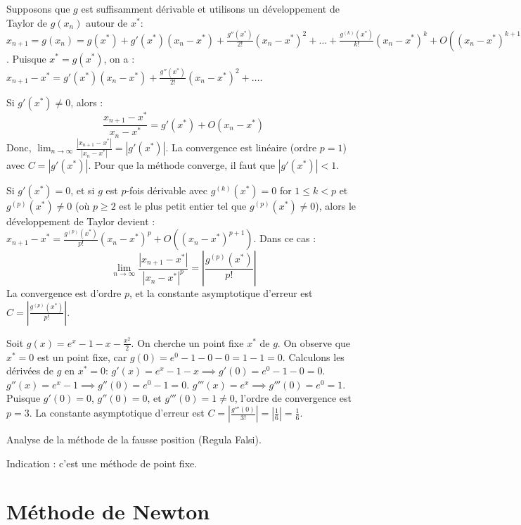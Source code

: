Supposons que $g$ est suffisamment dérivable et utilisons un développement de Taylor de $g(x_n)$ autour de $x^*$:
$x_{n+1} = g(x_n) = g(x^*) + g'(x^*)(x_n - x^*) + \frac{g''(x^*)}{2!}(x_n - x^*)^2 + \dots + \frac{g^{(k)}(x^*)}{k!}(x_n - x^*)^k + O((x_n - x^*)^{k+1})$.
Puisque $x^* = g(x^*)$, on a :
$x_{n+1} - x^* = g'(x^*)(x_n - x^*) + \frac{g''(x^*)}{2!}(x_n - x^*)^2 + \dots$.

Si $g'(x^*) \neq 0$, alors :
$$ \frac{x_{n+1} - x^*}{x_n - x^*} = g'(x^*) + O(x_n - x^*) $$
Donc, $\lim_{n \to \infty} \frac{|x_{n+1} - x^*|}{|x_n - x^*|} = |g'(x^*)|$.
La convergence est linéaire (ordre $p=1$) avec $C = |g'(x^*)|$. Pour que la méthode converge, il faut que $|g'(x^*)| < 1$.

Si $g'(x^*) = 0$, et si $g$ est $p$-fois dérivable avec $g^{(k)}(x^*) = 0$ for $1 \le k < p$ et $g^{(p)}(x^*) \neq 0$ (où $p \ge 2$ est le plus petit entier tel que $g^{(p)}(x^*) \neq 0$), alors le développement de Taylor devient :
$x_{n+1} - x^* = \frac{g^{(p)}(x^*)}{p!}(x_n - x^*)^p + O((x_n - x^*)^{p+1})$.
Dans ce cas :
$$ \lim_{n \to \infty} \frac{|x_{n+1} - x^*|}{|x_n - x^*|^p} = \left|\frac{g^{(p)}(x^*)}{p!}\right| $$
La convergence est d'ordre $p$, et la constante asymptotique d'erreur est $C = \left|\frac{g^{(p)}(x^*)}{p!}\right|$.

\begin{example}
Soit $g(x) = e^x - 1 - x - \frac{x^2}{2}$.
On cherche un point fixe $x^*$ de $g$. On observe que $x^*=0$ est un point fixe, car $g(0) = e^0 - 1 - 0 - 0 = 1 - 1 = 0$.
Calculons les dérivées de $g$ en $x^*=0$:
$g'(x) = e^x - 1 - x \implies g'(0) = e^0 - 1 - 0 = 0$.
$g''(x) = e^x - 1 \implies g''(0) = e^0 - 1 = 0$.
$g'''(x) = e^x \implies g'''(0) = e^0 = 1$.
Puisque $g'(0)=0$, $g''(0)=0$, et $g'''(0) = 1 \neq 0$, l'ordre de convergence est $p=3$.
La constante asymptotique d'erreur est $C = \left|\frac{g'''(0)}{3!}\right| = \left|\frac{1}{6}\right| = \frac{1}{6}$.
\end{example}

\begin{exercice}
Analyse de la méthode de la fausse position (Regula Falsi).
\end{exercice}
\begin{solution}
Indication : c'est une méthode de point fixe.
\end{solution}

\section{Méthode de Newton}
\label{sec:methode_newton}

